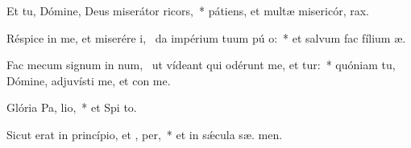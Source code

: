 \item Et tu, Dómine, Deus miserátor  ricors,~* pátiens, et multæ misericór,  rax.
\item Réspice in me, et miserére i,~\pscross{} da impérium tuum pú o:~* et salvum fac fílium  æ.
\item Fac mecum signum in num,~\pscross{} ut vídeant qui odérunt me, et tur:~* quóniam tu, Dómine, adjuvísti me, et con  me.
\item Glória Pa,  lio,~* et Spi to.
\item Sicut erat in princípio, et ,  per,~* et in sǽcula sæ. men.
